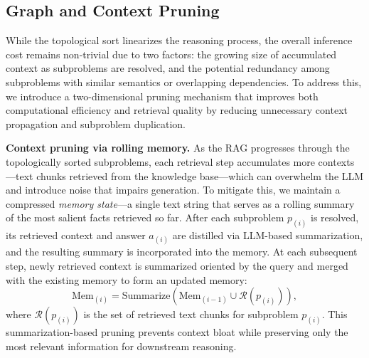 \documentclass[letterpaper]{article} %
\begin{document}



\subsection{Graph and Context Pruning}
\label{sec:pruning}

While the topological sort linearizes the reasoning process, the overall inference cost remains non-trivial due to two factors: the growing size of accumulated context as subproblems are resolved, and the potential redundancy among subproblems with similar semantics or overlapping dependencies. To address this, we introduce a two-dimensional pruning mechanism that improves both computational efficiency and retrieval quality by reducing unnecessary context propagation and subproblem duplication.



\textbf{Context pruning via rolling memory.}  
As the RAG progresses through the topologically sorted subproblems, each retrieval step accumulates more contexts—text chunks retrieved from the knowledge base—which can overwhelm the LLM and introduce noise that impairs generation. To mitigate this, we maintain a compressed \textit{memory state}—a single text string that serves as a rolling summary of the most salient facts retrieved so far. After each subproblem $p_{(i)}$ is resolved, its retrieved context and answer $a_{(i)}$ are distilled via LLM-based summarization, and the resulting summary is incorporated into the memory. At each subsequent step, newly retrieved context is summarized oriented by the query and merged with the existing memory to form an updated memory:
\begin{equation}
\text{Mem}_{(i)} = \mathrm{Summarize}(\text{Mem}_{(i-1)} \cup \mathcal{R}(p_{(i)})),
\end{equation}
where $\mathcal{R}(p_{(i)})$ is the set of retrieved text chunks for subproblem $p_{(i)}$. This summarization-based pruning prevents context bloat while preserving only the most relevant information for downstream reasoning.
\end{document}
